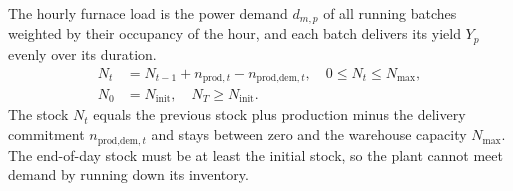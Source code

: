 \documentclass[5p,times,twocolumn]{elsarticle}
\begin{document}
The hourly furnace load is the power demand $d_{m,p}$ of all running batches
weighted by their occupancy of the hour, and each batch delivers its yield $Y_p$
evenly over its duration.
\begin{equation}
\begin{aligned}
N_t &= N_{t-1} + n_{\text{prod},t} - n_{\text{prod,dem},t},
\quad 0 \le N_t \le N_{\max},\\
N_0 &= N_{\text{init}}, \quad N_T \ge N_{\text{init}}.
\end{aligned}
\label{eq:inventory}
\end{equation}
The stock $N_t$ equals the previous stock plus production minus the delivery
commitment $n_{\text{prod,dem},t}$ and stays between zero and the warehouse
capacity $N_{\max}$. The end-of-day stock must be at least the initial stock, so
the plant cannot meet demand by running down its inventory.
\end{document}
